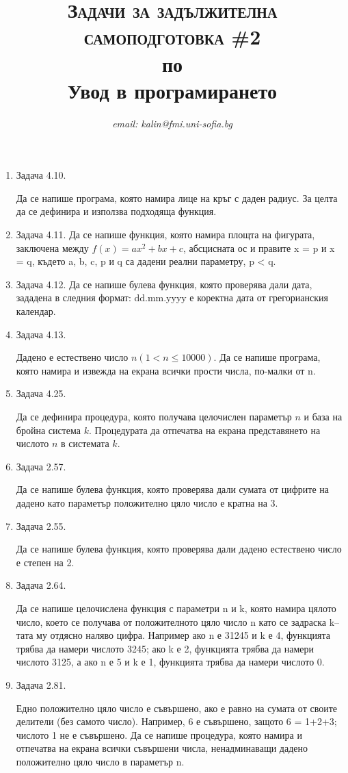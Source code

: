 \documentclass[12pt,a4paper]{article}
\author{\textit{email: kalin@fmi.uni-sofia.bg}}
\title{\textsc{Задачи за задължителна самоподготовка \#2} \\
по \\
Увод в програмирането}
\begin{document}
\maketitle


\begin{enumerate}
	\item Задача 4.10.

	Да се напише програма, която намира лице на кръг с даден радиус. За целта да се дефинира и използва подходяща функция.

	\item Задача 4.11. Да се напише функция, която намира площта на фигурата, заключена между $f(x) = ax^2 + bx + c$, абсцисната ос и правите x = p и x = q, където a, b, c, p и q са дадени реални параметру, p < q.

	\item Задача 4.12. Да се напише булева функция, която проверява дали дата, зададена в следния формат: dd.mm.yyyy е коректна дата от грегорианския календар. 

	\item Задача 4.13. 

	Дадено е естествено число $n (1 < n \leq 10000)$. Да се напише програма, която намира и извежда на екрана всички  прости числа, по-малки от n.

	\item Задача 4.25. 

	Да се дефинира процедура, която получава целочислен параметър $n$ и база на бройна система $k$. Процедурата да отпечатва на екрана представянето на числото $n$ в системата $k$.

\item Задача 2.57. 

Да се напише булева функция, която проверява дали сумата от цифрите на дадено като параметър положително цяло число е кратна на 3.

\item Задача 2.55. 

Да се напише булева функция, която проверява дали дадено естествено число е степен на 2.

\item Задача 2.64. 

Да се напише целочислена функция с параметри n и k, която намира цялото число, което се получава от положителното цяло число n като се задраска k–тата му отдясно наляво цифра. Например ако n е 31245 и k е 4, функцията трябва да намери числото 3245; ако k е 2, функцията трябва да намери числото 3125, а ако n е 5 и k е 1, функцията трябва да намери числото 0.

\item Задача 2.81. 

Едно положително цяло число е съвършено, ако е равно на сумата от своите делители (без самото число). Например, 6 е съвършено, защото 6 = 1+2+3; числото 1 не е съвършено. Да се напише процедура, която намира и отпечатва на екрана  всички съвършени числа, ненадминаващи дадено положително цяло число в параметър n.




\end{enumerate}
\end{document}

